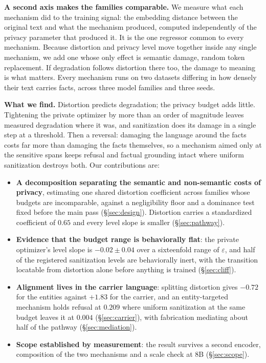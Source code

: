 \textbf{A second axis makes the families comparable.}
We measure what each mechanism did to the training signal:
the embedding distance between the original text and what the mechanism produced,
computed independently of the privacy parameter that produced it.
It is the one regressor common to every mechanism.
Because distortion and privacy level move together inside any single mechanism,
we add one whose only effect is semantic damage,
random token replacement.
If degradation follows distortion there too,
the damage to meaning is what matters.
Every mechanism runs on two datasets differing in how densely their text carries facts,
across three model families and three seeds.

\textbf{What we find.}
Distortion predicts degradation;
the privacy budget adds little.
Tightening the private optimizer by more than an order of magnitude leaves measured degradation where it was,
and sanitization does its damage in a single step at a threshold.
Then a reversal:
damaging the language around the facts costs far more than damaging the facts themselves,
so a mechanism aimed only at the sensitive spans keeps refusal and factual grounding intact where uniform sanitization destroys both.
Our contributions are:
\begin{itemize}\setlength{\itemsep}{2pt}\setlength{\parskip}{0pt}
  \item \textbf{A decomposition separating the semantic and non-semantic costs of privacy},
  estimating one shared distortion coefficient across families whose budgets are incomparable,
  against a negligibility floor and a dominance test fixed before the main pass (\S\ref{sec:design}).
  Distortion carries a standardized coefficient of $0.65$ and every level slope is smaller (\S\ref{sec:pathway}).
  \item \textbf{Evidence that the budget range is behaviorally flat}:
  the private optimizer's level slope is $-0.02 \pm 0.04$ over a sixteenfold range of $\varepsilon$,
  and half of the registered sanitization levels are behaviorally inert,
  with the transition locatable from distortion alone before anything is trained (\S\ref{sec:cliff}).
  \item \textbf{Alignment lives in the carrier language}:
  splitting distortion gives $-0.72$ for the entities against $+1.83$ for the carrier,
  and an entity-targeted mechanism holds refusal at $0.209$ where uniform sanitization at the same budget leaves it at $0.004$ (\S\ref{sec:carrier}),
  with fabrication mediating about half of the pathway (\S\ref{sec:mediation}).
  \item \textbf{Scope established by measurement}:
  the result survives a second encoder,
  composition of the two mechanisms and a scale check at $8$B (\S\ref{sec:scope}).
\end{itemize}

